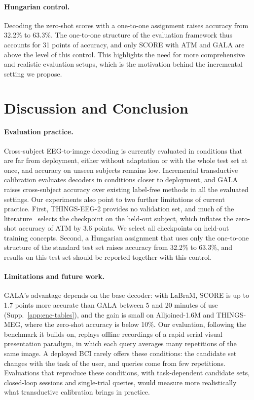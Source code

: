 \documentclass[10pt,twocolumn,letterpaper]{article}
\begin{document}
\paragraph{Hungarian control.}
Decoding the zero-shot scores with a one-to-one assignment raises accuracy from 32.2\% to 63.3\%. The one-to-one structure of the evaluation framework thus accounts for 31 points of accuracy, and only SCORE with ATM and GALA are above the level of this control. This highlights the need for more comprehensive and realistic evaluation setups, which is the motivation behind the incremental setting we propose.

\section{Discussion and Conclusion}
\label{sec:discussion}

\paragraph{Evaluation practice.}
Cross-subject EEG-to-image decoding is currently evaluated in conditions that are far from deployment, either without adaptation or with the whole test set at once, and accuracy on unseen subjects remains low. Incremental transductive calibration evaluates decoders in conditions closer to deployment, and GALA raises cross-subject accuracy over existing label-free methods in all the evaluated settings. Our experiments also point to two further limitations of current practice. First, THINGS-EEG-2 provides no validation set, and much of the literature~\cite{zhang2025neurobridge,du2025shallow,huang2026sattc} selects the checkpoint on the held-out subject, which inflates the zero-shot accuracy of ATM by 3.6 points. We select all checkpoints on held-out training concepts. Second, a Hungarian assignment that uses only the one-to-one structure of the standard test set raises accuracy from 32.2\% to 63.3\%, and results on this test set should be reported together with this control.
 

\paragraph{Limitations and future work.}
 GALA's advantage depends on the base decoder: with LaBraM, SCORE is up to 1.7 points more accurate than GALA between 5 and 20 minutes of use (Supp.~\ref{app:enc-tables}), and the gain is small on Alljoined-1.6M and THINGS-MEG, where the zero-shot accuracy is below 10\%. Our evaluation, following the benchmark it builds on, replays offline recordings of a rapid serial visual presentation paradigm, in which each query averages many repetitions of the same image. A deployed BCI rarely offers these conditions: the candidate set changes with the task of the user, and queries come from few repetitions. Evaluations that reproduce these conditions, with task-dependent candidate sets, closed-loop sessions and single-trial queries, would measure more realistically what transductive calibration brings in practice. 
\end{document}

